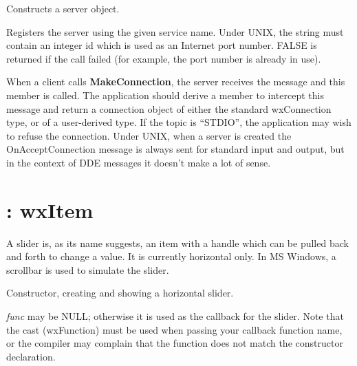 

Constructs a server object.



Registers the server using the given service name. Under UNIX, the
string must contain an integer id which is used as an Internet port
number. FALSE is returned if the call failed (for example, the port
number is already in use).

\label{wxserveronacceptconnection}


When a client calls {\bf MakeConnection}, the server receives the
message and this member is called. The application should derive a
member to intercept this message and return a connection object of
either the standard wxConnection type, or of a user-derived type. If the
topic is ``STDIO'', the application may wish to refuse the connection.
Under UNIX, when a server is created the OnAcceptConnection message is
always sent for standard input and output, but in the context of DDE
messages it doesn't make a lot of sense.

\section{: wxItem}\label{wxslider}

A slider is, as its name suggests, an item with a handle which can be pulled
back and forth to change a value.  It is currently horizontal only. In MS Windows,
a scrollbar is used to simulate the slider.

\label{constrslider}


Constructor, creating and showing a horizontal slider.

{\it func} may be NULL; otherwise it is used as the callback for the
slider.  Note that the cast (wxFunction) must be used when passing your
callback function name, or the compiler may complain that the function
does not match the constructor declaration.

